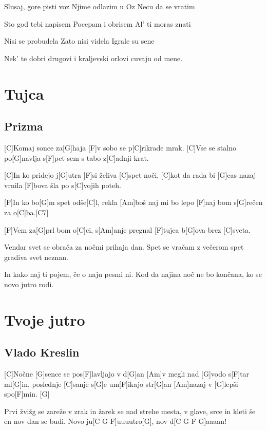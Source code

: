 \documentclass[a4paper,12pt]{article}
\begin{document}
\begin{multicols}{2}
\begin{guitar}
Slusaj, gore pisti voz
Njime odlazim u Oz
Necu da se vratim


Sto god tebi napisem
Pocepam i obrisem
Al' ti moras znati


Nisi se probudela
Zato nisi videla
Igrale su sene


Nek' te dobri drugovi
i kraljevski orlovi
cuvaju od mene.

\end{guitar}
\section{Tujca}
\subsection*{Prizma}
\begin{guitar}

[C]Komaj sonce za[G]haja [F]v sobo se p[C]rikrade mrak. 
[C]Vse se stalno po[G]navlja 
s[F]pet sem s tabo z[C]adnji krat. 


[C]In ko pridejo j[G]utra [F]si želiva [C]spet noči, 
[C]kot da rada bi [G]cas nazaj vrnila 
[F]bova šla po s[C]vojih poteh. 

 
[F]In ko bo[G]m spet odše[C]l, rekla [Am]boš naj mi bo lepo 
[F]naj bom s[G]rečen za o[C]ba.[C7] 


[F]Vem za[G]prl bom o[C]ci, s[Am]anje pregnal 
[F]tujca b[G]ova brez [C]sveta. 


Vendar svet se obrača za nočmi prihaja dan. 
Spet se vračam z večerom 
spet gradiva svet neznan. 


In kako naj ti pojem, če o naju pesmi ni. 
Kod da najina noč ne bo končana, 
ko se novo jutro rodi. 

\end{guitar}
\section{Tvoje jutro}
\subsection*{Vlado Kreslin}
\begin{guitar}

[C]Nočne [G]sence se pos[F]lavljajo v d[G]an 
[Am]v megli nad [G]vodo s[F]tar ml[G]in, 
poslednje [C]sanje s[G]e um[F]ikajo str[G]an 
[Am]nazaj v [G]lepši spo[F]min. [G]


Prvi žvižg se zareže v zrak 
in žarek se 
nad strehe mesta, v glave, 
srce in kleti 
še en nov dan se budi. 
Novo ju[C G F]uuuutro[G], nov d[C G F G]aaaan!



\end{guitar}
\end{multicols}
\end{document}
